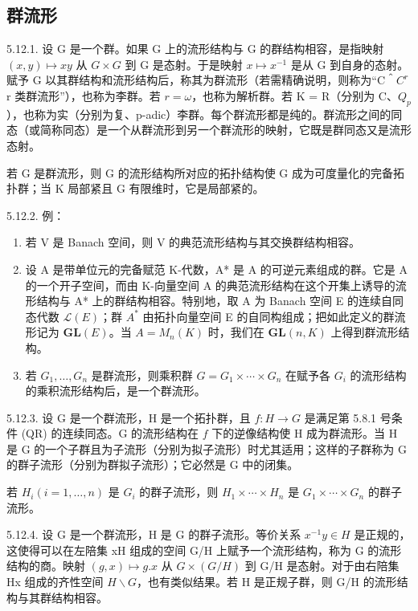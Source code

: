 \subsection{群流形}

5.12.1. 设 G 是一个群。如果 G 上的流形结构与 G 的群结构相容，是指映射 \((x, y) \mapsto xy\) 从 \(G \times G\) 到 G 是态射。于是映射 \(x \mapsto x^{-1}\) 是从 G 到自身的态射。赋予 G 以其群结构和流形结构后，称其为群流形（若需精确说明，则称为“C＾\(C^{r}\)r 类群流形”），也称为李群。若 \(r = \omega\)，也称为解析群。若 K = R（分别为 C、\(Q_{p}\)），也称为实（分别为复、p-adic）李群。每个群流形都是纯的。群流形之间的同态（或简称同态）是一个从群流形到另一个群流形的映射，它既是群同态又是流形态射。

若 G 是群流形，则 G 的流形结构所对应的拓扑结构使 G 成为可度量化的完备拓扑群；当 K 局部紧且 G 有限维时，它是局部紧的。

5.12.2. 例：

\begin{enumerate}
\def\labelenumi{(\roman{enumi})}
\item
  若 V 是 Banach 空间，则 V 的典范流形结构与其交换群结构相容。
\item
  设 A 是带单位元的完备赋范 K-代数，A* 是 A 的可逆元素组成的群。它是 A 的一个开子空间，而由 K-向量空间 A 的典范流形结构在这个开集上诱导的流形结构与 A* 上的群结构相容。特别地，取 A 为 Banach 空间 E 的连续自同态代数 \(\mathcal{L}(E)\)；群 \(A^{*}\) 由拓扑向量空间 E 的自同构组成；把如此定义的群流形记为 \(\mathbf{GL}(E)\)。当 \(A = M_{n}(K)\) 时，我们在 \(\mathbf{GL}(n, K)\) 上得到群流形结构。
\item
  若 \(G_{1},\ldots,G_{n}\) 是群流形，则乘积群 \(G=G_{1}\times\cdots\times G_{n}\) 在赋予各 \(G_{i}\) 的流形结构的乘积流形结构后，是一个群流形。
\end{enumerate}

5.12.3. 设 G 是一个群流形，H 是一个拓扑群，且 \(f:H\to G\) 是满足第 5.8.1 号条件 (QR) 的连续同态。G 的流形结构在 \(f\) 下的逆像结构使 H 成为群流形。当 H 是 G 的一个子群且为子流形（分别为拟子流形）时尤其适用；这样的子群称为 G 的群子流形（分别为群拟子流形）；它必然是 G 中的闭集。

若 \(H_{i}(i=1,\ldots,n)\) 是 \(G_{i}\) 的群子流形，则 \(H_{1}\times\cdots\times H_{n}\) 是 \(G_{1}\times\cdots\times G_{n}\) 的群子流形。

5.12.4. 设 G 是一个群流形，H 是 G 的群子流形。等价关系 \(x^{-1}y \in H\) 是正规的，这使得可以在左陪集 xH 组成的空间 G/H 上赋予一个流形结构，称为 G 的流形结构的商。映射 \((g, x) \mapsto g.x\) 从 \(G \times (G/H)\) 到 G/H 是态射。对于由右陪集 Hx 组成的齐性空间 \(H\backslash G\)，也有类似结果。若 H 是正规子群，则 G/H 的流形结构与其群结构相容。

